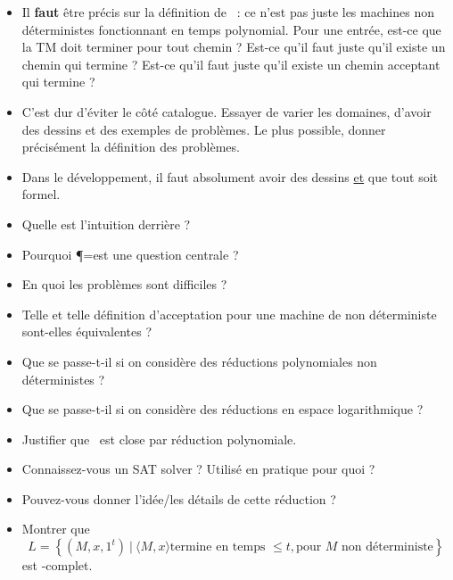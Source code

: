 \documentclass{agregfiche}
\begin{document}
\secpieges

\begin{itemize}
	\item Il \textbf{faut} être précis sur la définition de \NP\ : ce
	n'est
	pas juste les machines non déterministes fonctionnant en temps
	polynomial. Pour une
	entrée, est-ce que la TM doit terminer pour tout chemin ? Est-ce
	qu'il faut juste qu'il existe un chemin qui termine ? Est-ce
	qu'il faut juste qu'il existe un chemin acceptant qui termine ?
    \item C'est dur d'éviter le côté catalogue. Essayer de varier les
    domaines, d'avoir des dessins et des exemples de problèmes. Le
    plus possible, donner précisément la définition des problèmes.
    \item Dans le développement, il faut absolument avoir des
    dessins \underline{et} que tout soit formel.
\end{itemize}

\secquestionsclassiques

\begin{itemize}
	\item Quelle est l'intuition derrière \NP?
    \item Pourquoi \P=\NP est une question centrale ?
    \item En quoi les problèmes \NP sont difficiles ?
    \item Telle et telle définition d'acceptation pour une machine
    de  non déterministe sont-elles équivalentes ?
    \item Que se passe-t-il si on considère des réductions polynomiales
    non déterministes ?
    \item Que se passe-t-il si on considère des réductions en espace
    logarithmique ?
    \item Justifier que \NP\ est close par réduction polynomiale.
    \item Connaissez-vous un SAT solver ? Utilisé en pratique pour
    quoi ?
    \item Pouvez-vous donner l'idée/les détails de cette réduction ?
    \item Montrer que
\[
            L = \left\{ (M, x, 1^t) ~|~ \langle M, x \rangle \text{
            termine en
                temps  }\leq t, \text{pour }M \text{ non déterministe}
            \right\}
\]
est \NP-complet.

\end{itemize}

\secreferences
\end{document}
